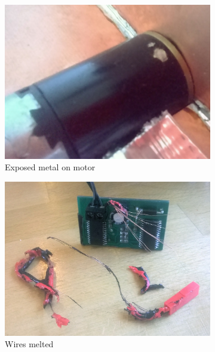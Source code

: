 \documentclass[main.tex]{subfiles}
\begin{document}
	\begin{figure}[b]
		\centering
		\begin{subfigure}[t]{\linewidth/3-1em}
			\includegraphics[width=\linewidth]{figures/short-motor.jpg}
			\caption{Exposed metal on motor}
			\label{fig:short:cause}
		\end{subfigure}\hfill
		\begin{subfigure}[t]{\linewidth/3-1em}
			\includegraphics[width=\linewidth]{figures/wires.jpg}
			\caption{Wires melted}
			\label{fig:short:wires}
		\end{subfigure}\hfill
		\begin{subfigure}[t]{\linewidth/3 - 1em}

\end{subfigure}
\end{figure}
\end{document}
